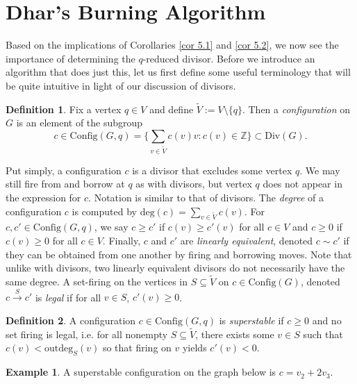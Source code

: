 \documentclass[openany, amssymb, psamsfonts]{amsart}
\theoremstyle{definition}
\newtheorem{defn}{Definition}[section]
\newtheorem{exmp}{Example}[section]
\numberwithin{equation}{section}
\begin{document}
\section{Dhar's Burning Algorithm}
\label{6}

Based on the implications of Corollaries \ref{cor 5.1} and \ref{cor 5.2}, we now see the importance of determining the $q$-reduced  divisor. Before we introduce an algorithm that does just this, let us first define some useful terminology that will be quite intuitive in light of our discussion of divisors.

\begin{defn}
\label{defn 6.1}
Fix a vertex $q\in V$ and define $\tilde{V}:=V\setminus \{q\}$. Then a \textit{configuration} on $G$ is an element of the subgroup
\[c\in \text{Config}(G,q)=\{\sum_{v\in \tilde{V}}c(v)v:c(v)\in \mathbb{Z}\}\subset \text{Div}(G).\]
\end{defn}

Put simply, a configuration $c$ is a divisor that excludes some vertex $q$. We may still fire from and borrow at $q$ as with divisors, but vertex $q$ does not appear in the expression for $c$. Notation is similar to that of divisors. The \textit{degree} of a configuration $c$ is computed by $\text{deg}(c)=\sum_{v\in \tilde{V}}c(v)$. For $c, c'\in \text{Config}(G,q)$, we say $c\geq c'$ if $c(v)\geq c'(v)$ for all $c\in V$ and $c\geq 0$ if $c(v)\geq 0$ for all $c\in V$. Finally, $c$ and $c'$ are \textit{linearly equivalent}, denoted $c\sim c'$ if they can be obtained from one another by firing and borrowing moves. Note that unlike with divisors, two linearly equivalent divisors do not necessarily have the same degree. A set-firing on the vertices in $S\subseteq \tilde{V}$ on $c\in \text{Config}(G)$, denoted $c\xrightarrow{S} c'$ is \textit{legal} if for all $v\in S$, $c'(v)\geq 0$.

\begin{defn}
\label{defn 6.3}
A configuration $c\in \text{Config}(G,q)$ is \textit{superstable} if $c\geq 0$ and no set firing is legal, i.e. for all nonempty $S\subseteq \tilde{V}$, there exists some $v\in S$ such that $c(v)<\text{outdeg}_S(v)$ so that firing on $v$ yields $c'(v)<0$.
\end{defn}

\begin{exmp}
A superstable configuration on the graph below is $c=v_2+2v_3$.
\begin{center}
    
\end{center}
\end{exmp}
\end{document}
